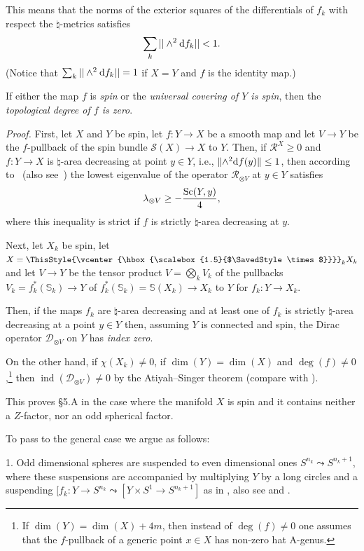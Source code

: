 \documentclass[pdftex]{sigma}
\numberwithin{equation}{section}
\newcommand\bigtimes{\mathbin{\ThisStyle{\vcenter{\hbox{%
\scalebox{1.5}{$\SavedStyle\times$}}}}}}
\begin{document}
This means that the norms of the exterior squares of the differentials of $f _k$ with respect the $\natural$-metrics satisfies
\begin{equation}
\sum_k||\wedge^2{\rm d}f_k||< 1.\label{eq-a}
\end{equation}
(Notice that $\sum_k||\wedge^2{\rm d}f_k||= 1$ if $X=Y$ and $f$ is the identity map.)

If either the map $f$ is {\it spin} or the {\it universal covering of $Y$ is spin}, then the {\it topological degree of $f$ is zero}.

{\it Proof.} First, let $X$ and $Y$ be spin, let $f\colon Y\to X$ be a smooth map and
 let $V\to Y$ be the $f$-pullback of the spin bundle $\mathcal S (X)\to X$ to $Y$.
Then, if $\mathcal R^X\geq 0$ and $ f\colon Y\to X$ is $\natural$-area decreasing at point $y\in Y$, i.e., $\|{\wedge}^2{\rm d}f(y)\|\leq 1$, then
according to~\cite{GS2002} (also see~\cite{Li2010}) the lowest eigenvalue of the operator
$\mathcal R_{\otimes V} $ at $y\in Y$ satisfies
\[
\lambda_{\otimes V}\geq -{\operatorname{Sc}(Y,y)\over 4},
\]
where this inequality is strict if $ f$ is strictly $\natural$-area decreasing at $y$.

 Next, let $X_k$ be spin, let $X=\bigtimes_kX_k$ and let $V\to Y$ be the tensor product $V=\bigotimes_kV_k$
of the pullbacks $V_k=f^\ast_k (\mathbb S_k)\to Y$ of $f^\ast_k (\mathbb S_k)=\mathbb S(X_k)\to X_k$ to $Y$ for $f_k\colon Y\to X_k$.

Then, if the maps $f_k$ are $\natural$-area decreasing and at least
one of $f_k$ is strictly $\natural$-area decreasing at a point $y\in Y$
 then, assuming $Y$ is connected and spin, the Dirac operator $\mathcal D_{\otimes V}$ on $Y$ has {\it index zero}.

On the other hand, if $\chi(X_k)\neq 0$, if $\dim(Y)=\dim(X)$ and
$\deg (f)\neq 0$,\footnote{If $\dim(Y)=\dim(X)+4m$, then instead of $\deg(f)\neq 0$ one assumes that the $f$-pullback of a generic point $x\in X$ has non-zero
hat A-genus.}
 then $\operatorname{ind}( \mathcal D_{\otimes V})\neq 0$ by the
 Atiyah--Singer theorem (compare with \cite{GS2002, Li2010, Ll1998}).

This proves \S5.A in the case where the manifold $X$ is spin and it contains neither a $Z$-factor, nor an
odd spherical factor.

 To pass to the general case we argue as follows:

1. Odd dimensional spheres are suspended to even dimensional
ones $S^{n_k}\leadsto S^{n_k+1}$, where these suspensions
 are accompanied by multiplying $Y$ by a long circles and a suspending $[f_k\colon Y\to S^{n_k}\leadsto [Y\times S^1\to S^{n_k+1}]$ as
 in \cite{Ll1998}, also see \cite[\S3.4.1]{Gr2021} and \cite{Gr2023}.
\end{document}
